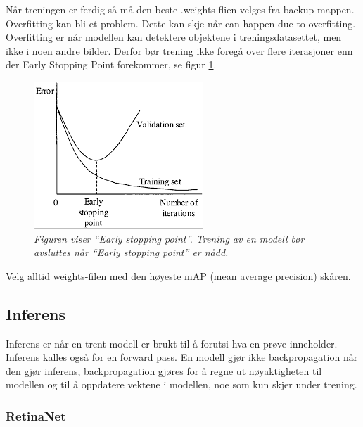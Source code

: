 Når treningen er ferdig så må den beste .weights-flien velges fra backup-mappen. Overfitting kan bli et problem. Dette kan skje når  can happen due to overfitting. Overfitting er når modellen kan detektere objektene i treningsdatasettet, men ikke i noen andre bilder. Derfor bør trening ikke foregå over flere iterasjoner enn der Early Stopping Point forekommer, se figur \ref{fig:early_stopping_point}. \cite{Bochkovskiy 2020}

\begin{figure}[h!]
\begin{center} 
\includegraphics[scale=1.0]{figures/early_stopping_point}
\caption{\small \sl Figuren viser ``Early stopping point''. Trening av en modell bør avsluttes når ``Early stopping point'' er nådd. \cite{Bochkovskiy 2020} \label{fig:early_stopping_point}}
\end{center}
\end{figure}

Velg alltid weights-filen med den høyeste mAP (mean average precision) skåren.


\subsection{Inferens}

Inferens er når en trent modell er brukt til å forutsi hva en prøve inneholder. Inferens kalles også for en forward pass. En modell gjør ikke backpropagation når den gjør inferens, backpropagation gjøres for å regne ut nøyaktigheten til modellen og til å oppdatere vektene i modellen, noe som kun skjer under trening. 

\subsubsection{RetinaNet}

